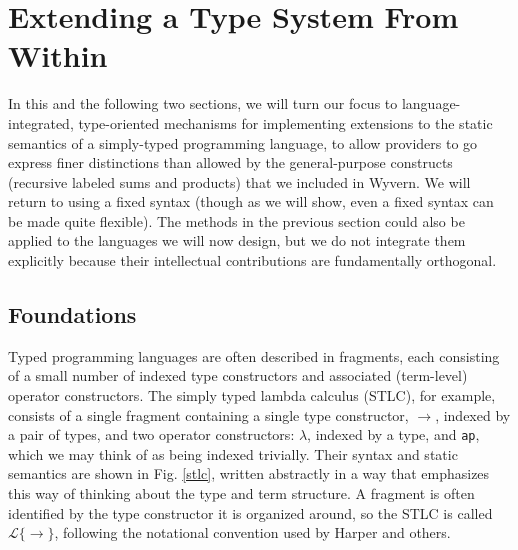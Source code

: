 


\section{Extending a Type System From Within}\label{att}
In this and the following two sections, we will turn our focus to language-integrated, type-oriented mechanisms for implementing extensions to the static semantics of a simply-typed programming language, to allow providers to go express finer distinctions than allowed by the general-purpose constructs (recursive labeled sums and products) that we included in Wyvern. We will return to using a fixed syntax (though as we will show, even a fixed syntax can be made quite flexible). The methods in the previous section could also be applied to the languages we will now design, but we do not integrate them explicitly because their intellectual  contributions are fundamentally orthogonal.%
\subsection{Foundations}
Typed programming languages are often described in fragments, each consisting of a small number of indexed type constructors and associated (term-level) operator constructors. The simply typed lambda calculus (STLC), for example, consists of a single fragment containing a single type constructor, $\rightarrow$, indexed by a pair of types, and two operator constructors: $\lambda$, indexed by a type, and \verb|ap|, which we may think of as being indexed trivially. Their syntax and static semantics are shown in Fig. \ref{stlc}, written abstractly in a way that emphasizes this way of thinking about the type and term structure. A fragment is often identified by the type constructor it is organized around, so the STLC is  called $\mathcal{L}\{\rightarrow\}$, following the notational convention used by Harper \cite{pfpl} and others. 

